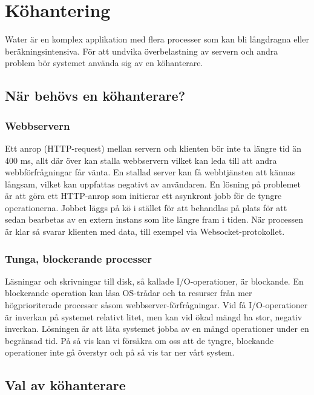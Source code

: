 \section{Köhantering}

Water är en komplex applikation med flera processer som kan bli långdragna eller beräkningsintensiva. För att undvika överbelastning av servern och andra problem bör systemet använda sig av en köhanterare.

\subsection{När behövs en köhanterare?}

\subsubsection{Webbservern}

Ett anrop (HTTP-request) mellan servern och klienten bör inte ta längre tid än 400 ms, allt där över kan stalla webbservern vilket kan leda till att andra webbförfrågningar får vänta. En stallad server kan få webbtjänsten att kännas långsam, vilket kan uppfattas negativt av användaren.
En lösning på problemet är att göra ett HTTP-anrop som initierar ett asynkront jobb för de tyngre operationerna. Jobbet läggs på kö i stället för att behandlas på plats för att sedan bearbetas av en extern instans som lite längre fram i tiden. När processen är klar så svarar klienten med data, till exempel via Websocket-protokollet.

\subsubsection{Tunga, blockerande processer}

Läsningar och skrivningar till disk, så kallade I/O-operationer, är blockande. En blockerande operation kan låsa OS-trådar och ta resurser från mer högprioriterade processer såsom webbserver-förfrågningar.
Vid få I/O-operationer är inverkan på systemet relativt litet, men kan vid ökad mängd ha stor, negativ inverkan.
Lösningen är att låta systemet jobba av en mängd operationer under en begränsad tid. På så vis kan vi försäkra om oss att de tyngre, blockande operationer inte gå överstyr och på så vis tar ner vårt system.

\subsection{Val av köhanterare}

